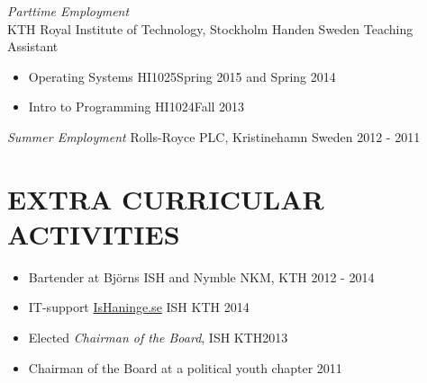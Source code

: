 \documentclass[margin]{res}
\begin{document}
\begin{resume}
   {\sl Parttime Employment }  \\
               KTH Royal Institute of Technology, Stockholm Handen Sweden
               Teaching Assistant
                 \begin{itemize}  \itemsep -2pt %
                 \item   Operating Systems HI1025\hfill Spring 2015 and Spring 2014
                 \item  Intro to Programming HI1024\hfill Fall 2013
                \end{itemize}

                
     {\sl Summer Employment } Rolls-Royce PLC, Kristinehamn Sweden \hfill 2012 - 2011 
                 


\section{EXTRA CURRICULAR ACTIVITIES}
\begin{itemize}  
            \item Bartender at Björns ISH and Nymble NKM, KTH \hfill 2012 - 2014 
            \item IT-support \href{ishaninge.se}{IsHaninge.se}  ISH KTH \hfill 2014
            \item Elected {\it Chairman of the Board},  ISH KTH\hfill 2013 
            \item Chairman of the Board at a  political youth chapter \hfill 2011
\end{itemize}

\end{resume}
\end{document}
